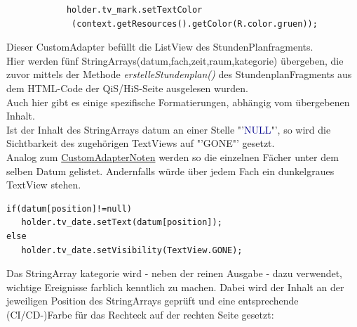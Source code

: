 \begin{description}
\begin{lstlisting}
            holder.tv_mark.setTextColor
             (context.getResources().getColor(R.color.gruen));
\end{lstlisting}
\newpage
{}
\label{CustomAdapterStundenplan}
Dieser CustomAdapter befüllt die ListView des StundenPlanfragments.\\
Hier werden fünf StringArrays(\textcolor{lila}{datum},\textcolor{lila}{fach},\textcolor{lila}{zeit},\textcolor{lila}{raum},\textcolor{lila}{kategorie}) übergeben, die zuvor mittels der Methode \textit{erstelleStundenplan()} des StundenplanFragments aus dem HTML-Code der QiS/HiS-Seite ausgelesen wurden.\\
Auch hier gibt es einige spezifische Formatierungen, abhängig vom übergebenen Inhalt.\\
Ist der Inhalt des StringArrays \textcolor{lila}{datum} an einer Stelle "'\textcolor{darkblue}{NULL}"', so wird die Sichtbarkeit des zugehörigen TextViews auf  "'\textcolor{lila}{GONE}"' gesetzt.\\
Analog zum \hyperref[CustomAdapterNoten]{CustomAdapterNoten} werden so die einzelnen Fächer unter dem selben Datum gelistet. Andernfalls würde über jedem Fach ein dunkelgraues TextView stehen.
\begin{lstlisting}
if(datum[position]!=null)
   holder.tv_date.setText(datum[position]);
else
   holder.tv_date.setVisibility(TextView.GONE);
\end{lstlisting}
Das StringArray \textcolor{lila}{kategorie} wird - neben der reinen Ausgabe - dazu verwendet, wichtige Ereignisse farblich kenntlich zu machen. Dabei wird der Inhalt an der jeweiligen Position des StringArrays geprüft und eine entsprechende (CI/CD-)Farbe für das Rechteck auf der rechten Seite gesetzt:


\end{description}

